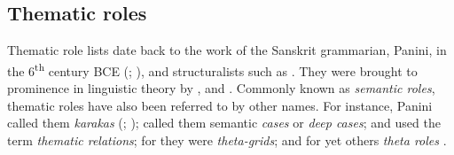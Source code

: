 \documentclass[output=paper]{langsci/langscibook}
\begin{document}
\subsection{Thematic roles}\label{sec:sibanda:2.1}

Thematic role lists date back to the work of the Sanskrit grammarian, Panini, in the 6\textsuperscript{th} century BCE (\citealt[548]{Dowty1991}; \citealt[19-20]{Srikumar2013}), and structuralists such as \citet{Blake1930}. They were brought to prominence in linguistic theory by \citet{Gruber1965,Fillmore1968,Fillmore1977}, and \citet{Jackendoff1972,Jackendoff1976}. Commonly known as \textit{semantic roles}, thematic roles have also been referred to by other names. For instance, Panini called them \textit{karakas} (\citealt[548]{Dowty1991}; \citealt[19-20]{Srikumar2013,Cardona1974}); \citet{Fillmore1968} called them semantic \textit{cases} or \textit{deep cases}; \citet{Gruber1965} and \citet{Jackendoff1972} used the term \textit{thematic relations}; for \citet{Stowell1981} they were \textit{theta-grids}; and for yet others \textit{theta roles} \citep{Chomsky1981,Marantz1984}. 
\end{document}
